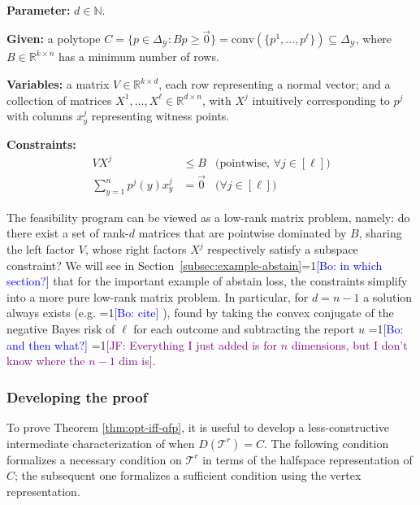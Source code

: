 \documentclass[anon]{colt2020} %
\newcommand{\Comments}{1}
\newcommand{\mynote}[2]{\ifnum\Comments=1\textcolor{#1}{#2}\fi}
\newcommand{\jessie}[1]{\mynote{purple}{[JF: #1]}}
\newcommand{\bo}[1]{\mynote{blue}{[Bo: #1]}}
\newcommand{\reals}{\mathbb{R}}
\newcommand{\simplex}{\Delta_\Y}
\newcommand{\T}{\mathcal{T}}
\newcommand{\Y}{\mathcal{Y}}
\newcommand{\conv}{\mathrm{conv}}
\begin{document}
\begin{definition} \label{def:qfp} ~ \\
  \indent \textbf{Parameter:} $d \in \mathbb{N}$.

  \textbf{Given:} a polytope $C = \{p \in \simplex : Bp \geq \vec 0\} = \conv(\{p^1, \ldots, p^\ell\}) \subseteq \simplex$, where $B \in \reals^{k \times n}$ has a minimum number of rows.

  \textbf{Variables:} a matrix $V \in \reals^{k \times d}$, each row representing a normal vector; and a collection of matrices $X^1,\ldots,X^{\ell} \in \reals^{d \times n}$, with $X^j$ intuitively corresponding to $p^j$ with columns $x^j_y$ representing witness points.

  \textbf{Constraints:}
    \begin{align}
      V X^j                     &\leq B    & \text{(pointwise, $\forall j \in [\ell]$)}  \label{eqn:qp-constr-1} \\
      \sum_{y=1}^n p^j(y) x^j_y &= \vec 0  & \text{($\forall j \in [\ell]$)}    \label{eqn:qp-constr-2}
    \end{align}
\end{definition}

The feasibility program can be viewed as a low-rank matrix problem, namely: do there exist a set of rank-$d$ matrices that are pointwise dominated by $B$, sharing the left factor $V$, whose right factors $X^j$ respectively satisfy a subspace constraint?
We will see in Section~\ref{subsec:example-abstain}\bo{in which section?} that for the important example of abstain loss, the constraints simplify into a more pure low-rank matrix problem.
In particular, for $d=n-1$ a solution always exists (e.g. \bo{cite} \cite[Theorem 2]{finocchiaro2019embedding}), found by taking the convex conjugate of the negative Bayes risk of $\ell$ for each outcome and subtracting the report $u$ \bo{and then what?} \jessie{Everything I just added is for $n$ dimensions, but I don't know where the $n-1$ dim is}.


\subsubsection{Developing the proof}

To prove Theorem \ref{thm:opt-iff-qfp}, it is useful to develop a less-constructive intermediate characterization of when $D(\T^r) = C$.
The following condition formalizes a necessary condition on $\T^r$ in terms of the halfspace representation of $C$; the subsequent one formalizes a sufficient condition using the vertex representation.
\end{document}
